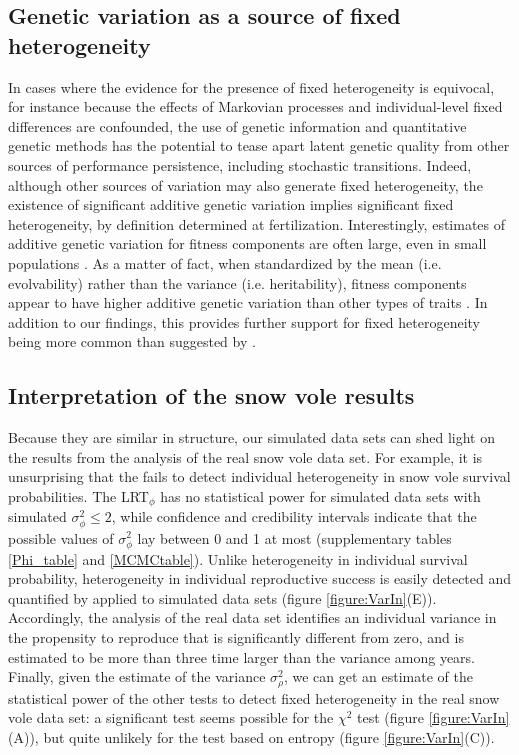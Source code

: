 \subsection{Genetic variation as a source of fixed heterogeneity}
In cases where the evidence for the presence of fixed heterogeneity is equivocal, for instance because the effects of Markovian processes and individual-level fixed differences are confounded, the use of genetic information and quantitative genetic methods has the potential to tease apart latent genetic quality from other sources of performance persistence, including stochastic transitions.
Indeed, although other sources of variation may also generate fixed heterogeneity, the existence of significant additive genetic variation implies significant fixed heterogeneity, by definition determined at fertilization.
Interestingly, estimates of additive genetic variation for fitness components are often large, even in small populations \parencite[for reviews see][]{Mousseau1987, Postma2014}. As a matter of fact, when standardized by the mean (i.e. evolvability) rather than the variance (i.e. heritability), fitness components appear to have higher additive genetic variation than other types of traits \parencite{Hansen2011,Postma2014}. In addition to our findings, this provides further support for fixed heterogeneity being more common than suggested by \NSM.

\subsection{Interpretation of the snow vole results}
Because they are similar in structure, our simulated data sets can shed light on the results from the analysis of the real snow vole data set. For example, it is  unsurprising that the \MM fails to detect individual heterogeneity in snow vole survival probabilities. The LRT$_\phi$ has no statistical power for simulated data sets with simulated $\sigma_{\phi}^2 \leq 2$, while confidence and credibility intervals indicate that the possible values of $\sigma_{\phi}^2$ lay between 0 and 1 at most (supplementary tables \ref{Phi_table} and \ref{MCMCtable}).  
Unlike heterogeneity in individual survival probability, heterogeneity in individual reproductive success is easily detected and quantified by \MM applied to simulated data sets (figure \ref{figure:VarIn}(E)). Accordingly, the analysis of the real data set identifies an individual variance in the propensity to reproduce that is significantly different from zero, and is estimated to be more than three time larger than the variance among years. Finally, given the estimate of the variance $\sigma_{\rho}^2$, we can get an estimate of the statistical power of the other tests to detect fixed heterogeneity in the real snow vole data set: a significant test seems possible for the $\chi^2$ test (figure \ref{figure:VarIn}(A)), but quite unlikely for the test based on entropy (figure \ref{figure:VarIn}(C)).

